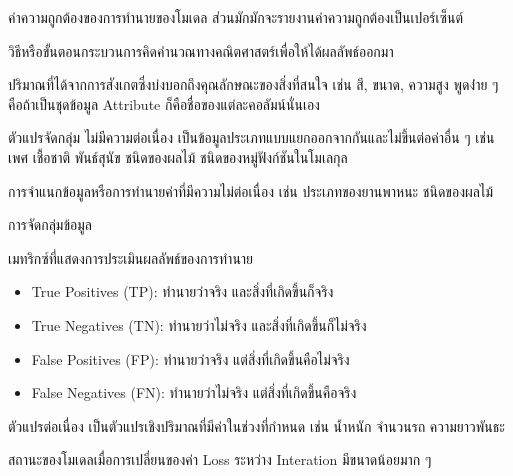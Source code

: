 \begin{description}[style=nextline]
    \item[Accuracy] ค่าความถูกต้องของการทำนายของโมเดล ส่วนมักมักจะรายงานค่าความถูกต้องเป็นเปอร์เซ็นต์

    \item[Algorithm] วิธีหรือขั้นตอนกระบวนการคิดคำนวณทางคณิตศาสตร์เพื่อให้ได้ผลลัพธ์ออกมา

    \item[Attribute] ปริมาณที่ได้จากการสังเกตซึ่งบ่งบอกถึงคุณลักษณะของสิ่งที่สนใจ เช่น สี, ขนาด, ความสูง พูดง่่าย ๆ คือถ้าเป็นชุดข้อมูล 
    Attribute ก็คือชื่อของแต่ละคอลัมน์นั่นเอง

    \item[Categorical variables] ตัวแปรจัดกลุ่ม ไม่มีความต่อเนื่อง เป็นข้อมูลประเภทแบบแยกออกจากกันและไม่ขึ้นต่อค่าอื่น ๆ เช่น 
    เพศ เชื้อชาติ พันธ์สุนัข ชนิดของผลไม้ ชนิดของหมู่ฟังก์ชันในโมเลกุล

    \item[Classification] การจำแนกข้อมูลหรือการทำนายค่าที่มีความไม่ต่อเนื่อง เช่น ประเภทของยานพาหนะ ชนิดของผลไม้
 
    \item[Clustering] การจัดกลุ่มข้อมูล

    \item[Confusion matrix] เมทริกซ์ที่แสดงการประเมินผลลัพธ์ของการทำนาย
    \begin{itemize}
        \item True Positives (TP): ทำนายว่าจริง และสิ่งที่เกิดขึ้นก็จริง
        \item True Negatives (TN): ทำนายว่าไม่จริง และสิ่งที่เกิดขึ้นก็ไม่จริง
        \item False Positives (FP): ทำนายว่าจริง แต่สิ่งที่เกิดขึ้นคือไม่จริง
        \item False Negatives (FN): ทำนายว่าไม่จริง แต่สิ่งที่เกิดขึ้นคือจริง
    \end{itemize}

    \item[Continuous variables] ตัวแปรต่อเนื่อง เป็นตัวแปรเชิงปริมาณที่มีค่าในช่วงที่กำหนด เช่น น้ำหนัก จำนวนรถ ความยาวพันธะ

    \item[Convergence] สถานะของโมเดลเมื่อการเปลี่ยนของค่า Loss ระหว่าง Interation มีขนาดน้อยมาก ๆ


\end{description}
